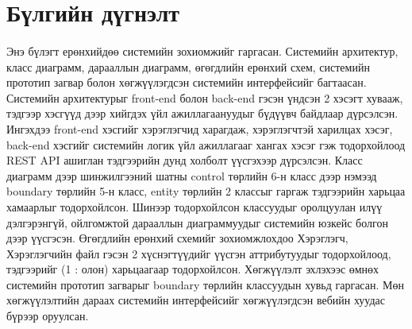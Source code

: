 \section{Бүлгийн дүгнэлт}
\paragraph{} Энэ бүлэгт ерөнхийдөө системийн зохиомжийг гаргасан. Системийн архитектур, класс диаграмм, дарааллын диаграмм, өгөгдлийн ерөнхий схем, системийн прототип загвар болон хөгжүүлэгдсэн системийн интерфейсийг багтаасан. Системийн архитектурыг front-end болон back-end гэсэн үндсэн 2 хэсэгт хувааж, тэдгээр хэсгүүд дээр хийгдэх үйл ажиллагаануудыг бүдүүвч байдлаар дүрсэлсэн. Ингэхдээ front-end хэсгийг хэрэглэгчид харагдаж, хэрэглэгчтэй харилцах хэсэг, back-end хэсгийг системийн логик үйл ажиллагааг хангах хэсэг гэж тодорхойлоод REST API ашиглан тэдгээрийн дунд холболт үүсгэхээр дүрсэлсэн. Класс диаграмм дээр шинжилгээний шатны control төрлийн 6-н класс дээр нэмээд boundary төрлийн 5-н класс, entity төрлийн 2 классыг гаргаж тэдгээрийн харьцаа хамаарлыг тодорхойлсон. Шинээр тодорхойлсон классуудыг оролцуулан илүү дэлгэрэнгүй, ойлгомжтой дарааллын диаграммуудыг системийн юзкейс болгон дээр үүсгэсэн. Өгөгдлийн ерөнхий схемийг зохиомжлохдоо Хэрэглэгч, Хэрэглэгчийн файл гэсэн 2 хүснэгтүүдийг үүсгэн аттрибутуудыг тодорхойлоод, тэдгээрийг (1 : олон) харьцаагаар тодорхойлсон. Хөгжүүлэлт эхлэхээс өмнөх системийн прототип загварыг boundary төрлийн классуудын хувьд гаргасан. Мөн хөгжүүлэлтийн дараах системийн интерфейсийг хөгжүүлэгдсэн вебийн хуудас бүрээр оруулсан. 